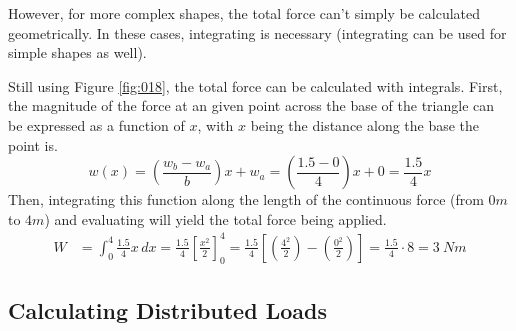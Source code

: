\documentclass[12pt]{article}
\begin{document}
However, for more complex shapes, the total force can't simply be calculated geometrically.
In these cases, integrating is necessary (integrating can be used for simple shapes as well).

Still using Figure \ref{fig:018}, the total force can be calculated with integrals. First,
the magnitude of the force at an given point across the base of the triangle can be expressed
as a function of $x$, with $x$ being the distance along the base the point is.
\begin{equation*}
  w(x) = \left(\frac{w_b - w_a}{b}\right)x + w_a = \left(\frac{1.5 - 0}{4}\right)x + 0 = \frac{1.5}{4}x
\end{equation*}
Then, integrating this function along the length of the continuous force (from $0m$ to $4m$)
and evaluating will yield the total force being applied.
\begin{align*}
  W &= \int_{0}^{4} \frac{1.5}{4}x \,dx = \frac{1.5}{4}\left[\frac{x^2}{2}\right]_{0}^{4} = \frac{1.5}{4}\left[\left(\frac{4^2}{2}\right)-\left(\frac{0^2}{2}\right)\right] = \frac{1.5}{4} \cdot 8 = 3\ Nm
\end{align*}

\subsection{Calculating Distributed Loads}
\label{ssec:calculatingDistributedLoads}
\end{document}
